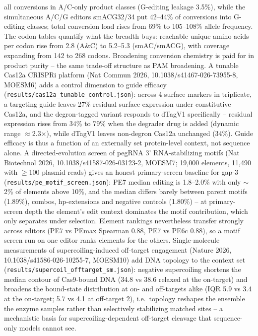 \documentclass[12pt]{article}
\begin{document}
all conversions in A/C-only product classes (G-editing leakage
3.5\%), while the simultaneous A/C/G editors smACG32/34 put 42--44\%
of conversions into G-editing classes; total conversion load rises
from 69\% to 105--108\% allele frequency. The codon tables quantify
what the breadth buys: reachable unique amino acids per codon rise
from 2.8 (A\&C) to 5.2--5.3 (smAC/smACG), with coverage expanding
from 142 to 268 codons. Broadening conversion chemistry is paid for
in product purity -- the same trade-off structure as PAM broadening.
A tunable Cas12a CRISPRi platform (Nat Commun 2026,
10.1038/s41467-026-73955-8, MOESM6) adds a control dimension to guide
efficacy (\texttt{results/cas12a\_tunable\_control.json}): across 4
surface markers in triplicate, a targeting guide leaves 27\% residual
surface expression under constitutive Cas12a, and the degron-tagged
variant responds to dTagV1 specifically -- residual expression rises
from 34\% to 79\% when the degrader drug is added (dynamic range
$\approx$2.3$\times$), while dTagV1 leaves non-degron Cas12a
unchanged (34\%). Guide efficacy is thus a function of an externally
set protein-level context, not sequence alone.
A directed-evolution screen of pegRNA 3' RNA-stabilizing motifs (Nat
Biotechnol 2026, 10.1038/s41587-026-03123-2, MOESM7; 19{,}000
elements, 11{,}490 with $\geq$100 plasmid reads) gives an honest
primary-screen baseline for gap-3
(\texttt{results/pe\_motif\_screen.json}): PE7 median editing is
1.8--2.0\% with only $\sim$2\% of elements above 10\%, and the
median differs barely between parent motifs (1.89\%), combos,
hp-extensions and negative controls (1.80\%) -- at primary-screen
depth the element's edit context dominates the motif contribution,
which only separates under selection. Element rankings nevertheless
transfer strongly across editors (PE7 vs PEmax Spearman 0.88, PE7 vs
PE6c 0.88), so a motif screen run on one editor ranks elements for
the others.
Single-molecule measurements of supercoiling-induced off-target
engagement (Nature 2026, 10.1038/s41586-026-10255-7, MOESM10) add DNA
topology to the context set (\texttt{results/supercoil\_offtarget\_sm.json}):
negative supercoiling shortens the median contour of Cas9-bound DNA
(34.8 vs 38.6 relaxed at the on-target) and broadens the bound-state
distribution at on- and off-targets alike (IQR 5.9 vs 3.4 at the
on-target; 5.7 vs 4.1 at off-target 2), i.e.\ topology reshapes the
ensemble the enzyme samples rather than selectively stabilizing
matched sites -- a mechanistic basis for supercoiling-dependent
off-target cleavage that sequence-only models cannot see.
\end{document}
